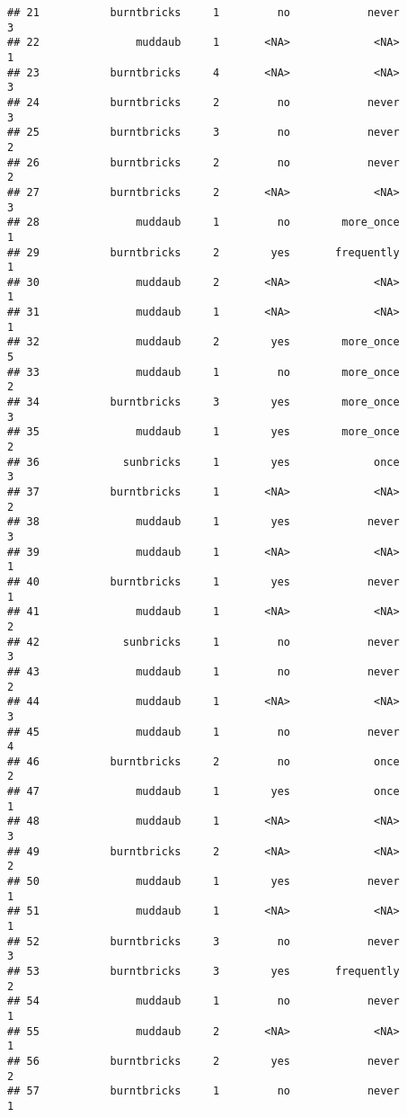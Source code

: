 \documentclass[
]{article}
\begin{document}
\begin{verbatim}
## 21           burntbricks     1         no            never         3
## 22               muddaub     1       <NA>             <NA>         1
## 23           burntbricks     4       <NA>             <NA>         3
## 24           burntbricks     2         no            never         3
## 25           burntbricks     3         no            never         2
## 26           burntbricks     2         no            never         2
## 27           burntbricks     2       <NA>             <NA>         3
## 28               muddaub     1         no        more_once         1
## 29           burntbricks     2        yes       frequently         1
## 30               muddaub     2       <NA>             <NA>         1
## 31               muddaub     1       <NA>             <NA>         1
## 32               muddaub     2        yes        more_once         5
## 33               muddaub     1         no        more_once         2
## 34           burntbricks     3        yes        more_once         3
## 35               muddaub     1        yes        more_once         2
## 36             sunbricks     1        yes             once         3
## 37           burntbricks     1       <NA>             <NA>         2
## 38               muddaub     1        yes            never         3
## 39               muddaub     1       <NA>             <NA>         1
## 40           burntbricks     1        yes            never         1
## 41               muddaub     1       <NA>             <NA>         2
## 42             sunbricks     1         no            never         3
## 43               muddaub     1         no            never         2
## 44               muddaub     1       <NA>             <NA>         3
## 45               muddaub     1         no            never         4
## 46           burntbricks     2         no             once         2
## 47               muddaub     1        yes             once         1
## 48               muddaub     1       <NA>             <NA>         3
## 49           burntbricks     2       <NA>             <NA>         2
## 50               muddaub     1        yes            never         1
## 51               muddaub     1       <NA>             <NA>         1
## 52           burntbricks     3         no            never         3
## 53           burntbricks     3        yes       frequently         2
## 54               muddaub     1         no            never         1
## 55               muddaub     2       <NA>             <NA>         1
## 56           burntbricks     2        yes            never         2
## 57           burntbricks     1         no            never         1

\end{verbatim}
\end{document}
